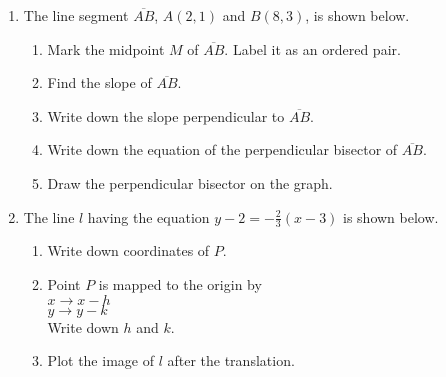 \documentclass[12pt, twoside]{article}
\begin{document}
\begin{enumerate}
\item The line segment $\overline{AB}$, $A(2,1)$ and $B(8,3)$, is shown below.
  \begin{multicols}{2}
    \begin{enumerate}
    \item Mark the midpoint $M$ of $\overline{AB}$. Label it as an ordered pair.
    \item Find the slope of $\overline{AB}$. \vspace{2cm}
    \item Write down the slope perpendicular to $\overline{AB}$. \vspace{1cm}
    \item Write down the equation of the perpendicular bisector of $\overline{AB}$. \vspace{2cm}
    \item Draw the perpendicular bisector on the graph.
  \end{enumerate} \vspace{1cm}  
  \begin{center} %
    \end{center} 
  \end{multicols}

\newpage

\item The line $l$ having the equation $\displaystyle y-2=-\frac{2}{3}(x-3)$ is shown below.
\begin{multicols}{2}
  \begin{enumerate}
    \item Write down coordinates of $P$.
    \item Point $P$ is mapped to the origin by\\ $x \rightarrow x-h$\\ $y \rightarrow y-k$ \\Write down $h$ and $k$.
    \item Plot the image of $l$ after the translation.
  \end{enumerate}
  \begin{flushright}
  \end{flushright}
\end{multicols}%


\end{enumerate}
\end{document}

